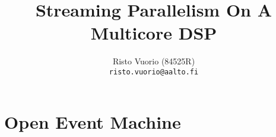 \documentclass[a4paper,10pt]{article}
\title{Streaming Parallelism On A Multicore DSP}
\author{Risto Vuorio (84525R) \\
		{\tt risto.vuorio@aalto.fi}}
\begin{document}
\maketitle
\newpage
\tableofcontents
\newpage



\section{Open Event Machine}



\newpage



\end{document}
